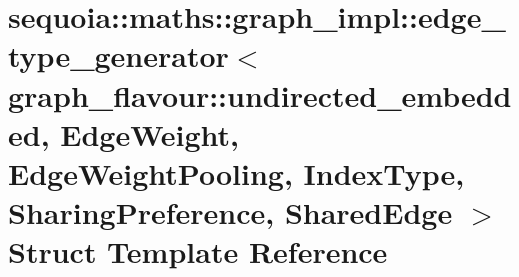 \hypertarget{structsequoia_1_1maths_1_1graph__impl_1_1edge__type__generator_3_01graph__flavour_1_1undirected_9e17ae143379e09deb5ba438fa684125}{}\section{sequoia\+::maths\+::graph\+\_\+impl\+::edge\+\_\+type\+\_\+generator$<$ graph\+\_\+flavour\+::undirected\+\_\+embedded, Edge\+Weight, Edge\+Weight\+Pooling, Index\+Type, Sharing\+Preference, Shared\+Edge $>$ Struct Template Reference}
\label{structsequoia_1_1maths_1_1graph__impl_1_1edge__type__generator_3_01graph__flavour_1_1undirected_9e17ae143379e09deb5ba438fa684125}
